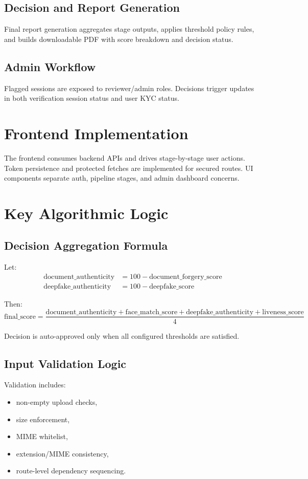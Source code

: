 \subsection{Decision and Report Generation}
Final report generation aggregates stage outputs, applies threshold policy rules, and builds downloadable PDF with score breakdown and decision status.

\subsection{Admin Workflow}
Flagged sessions are exposed to reviewer/admin roles. Decisions trigger updates in both verification session status and user KYC status.

\section{Frontend Implementation}
The frontend consumes backend APIs and drives stage-by-stage user actions. Token persistence and protected fetches are implemented for secured routes. UI components separate auth, pipeline stages, and admin dashboard concerns.

\section{Key Algorithmic Logic}
\subsection{Decision Aggregation Formula}
Let:
\begin{align*}
\text{document\_authenticity} &= 100 - \text{document\_forgery\_score} \\
\text{deepfake\_authenticity} &= 100 - \text{deepfake\_score}
\end{align*}

Then:
\[
\text{final\_score} = \frac{\text{document\_authenticity} + \text{face\_match\_score} + \text{deepfake\_authenticity} + \text{liveness\_score}}{4}
\]

Decision is auto-approved only when all configured thresholds are satisfied.

\subsection{Input Validation Logic}
Validation includes:
\begin{itemize}
\item non-empty upload checks,
\item size enforcement,
\item MIME whitelist,
\item extension/MIME consistency,
\item route-level dependency sequencing.
\end{itemize}

